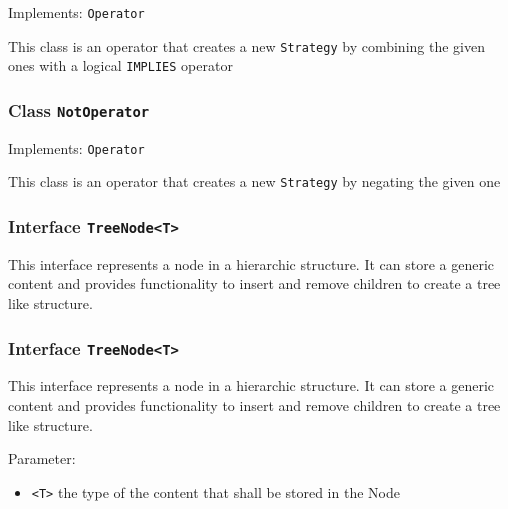 \documentclass[parskip=full,11pt]{scrartcl}
\begin{document}
Implements: \texttt{Operator}

This class is an operator that creates a new \texttt{Strategy} by combining the given ones with a logical \texttt{IMPLIES} operator

\subsubsection{Class \texttt{NotOperator}}

Implements: \texttt{Operator}

This class is an operator that creates a new \texttt{Strategy} by negating the given one

\subsubsection{Interface \texttt{TreeNode<T>}}

This interface represents a node in a hierarchic structure. It can store a generic content and provides functionality to insert and remove children to create a tree like structure.

\subsubsection{Interface \texttt{TreeNode<T>}}

This interface represents a node in a hierarchic structure. It can store a generic content and provides functionality to insert and remove children to create a tree like structure.

Parameter:
\begin{itemize}\itemsep -10pt
	\item \texttt{<T>} the type of the content that shall be stored in the Node
\end{itemize}
\end{document}
